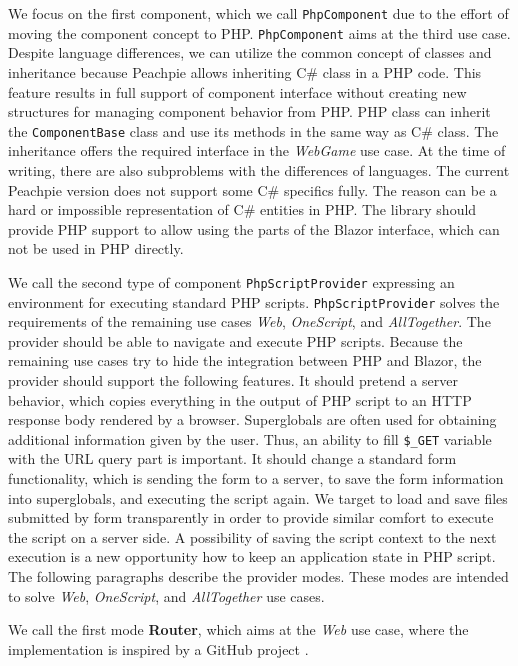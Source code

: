 \par
We focus on the first component, which we call \texttt{PhpComponent} due to the effort of moving the component concept to PHP.
\texttt{PhpComponent} aims at the third use case.
Despite language differences, we can utilize the common concept of classes and inheritance because Peachpie allows inheriting C\# class in a PHP code.
This feature results in full support of component interface without creating new structures for managing component behavior from PHP.
PHP class can inherit the \texttt{ComponentBase} class and use its methods in the same way as C\# class.
The inheritance offers the required interface in the \textit{WebGame} use case.
At the time of writing, there are also subproblems with the differences of languages.
The current Peachpie version does not support some C\# specifics fully.
The reason can be a hard or impossible representation of C\# entities in PHP.
The library should provide PHP support to allow using the parts of the Blazor interface, which can not be used in PHP directly.
\par
We call the second type of component \texttt{PhpScriptProvider} expressing an environment for executing standard PHP scripts.
\texttt{PhpScriptProvider} solves the requirements of the remaining use cases \textit{Web}, \textit{OneScript}, and \textit{AllTogether}.
The provider should be able to navigate and execute PHP scripts.
Because the remaining use cases try to hide the integration between PHP and Blazor, the provider should support the following features.
It should pretend a server behavior, which copies everything in the output of PHP script to an HTTP response body rendered by a browser.
Superglobals are often used for obtaining additional information given by the user.
Thus, an ability to fill \texttt{\$\_GET} variable with the URL query part is important.
It should change a standard form functionality, which is sending the form to a server, to save the form information into superglobals, and executing the script again.
We target to load and save files submitted by form transparently in order to provide similar comfort to execute the script on a server side.
A possibility of saving the script context to the next execution is a new opportunity how to keep an application state in PHP script.
The following paragraphs describe the provider modes.
These modes are intended to solve \textit{Web}, \textit{OneScript}, and \textit{AllTogether} use cases. 
\par
We call the first mode \textbf{Router}, which aims at the \textit{Web} use case, where the implementation is inspired by a GitHub project \cite{online:customRouter}.
